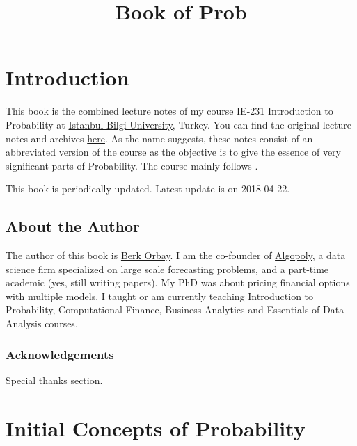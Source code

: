 \documentclass[]{book}
\title{Book of Prob}
\author{}
\date{}
\theoremstyle{definition}
\theoremstyle{definition}
\theoremstyle{definition}
\theoremstyle{remark}
\begin{document}
\maketitle

{
\setcounter{tocdepth}{1}
\tableofcontents
}
\hypertarget{introduction}{%
\chapter*{Introduction}\label{introduction}}

This book is the combined lecture notes of my course IE-231 Introduction
to Probability at \href{https://www.bilgi.edu.tr}{Istanbul Bilgi
University}, Turkey. You can find the original lecture notes and
archives \href{https://berkorbay.github.io/bilgi-ie231/}{here}. As the
name suggests, these notes consist of an abbreviated version of the
course as the objective is to give the essence of very significant parts
of Probability. The course mainly follows \citep{myers2012}.

This book is periodically updated. Latest update is on 2018-04-22.

\hypertarget{about-the-author}{%
\section*{About the Author}\label{about-the-author}}

The author of this book is \href{http://berkorbay.me}{Berk Orbay}. I am
the co-founder of \href{http://algopoly.com}{Algopoly}, a data science
firm specialized on large scale forecasting problems, and a part-time
academic (yes, still writing papers). My PhD was about pricing financial
options with multiple models. I taught or am currently teaching
Introduction to Probability, Computational Finance, Business Analytics
and Essentials of Data Analysis courses.

\hypertarget{acknowledgements}{%
\subsection*{Acknowledgements}\label{acknowledgements}}

Special thanks section.

\hypertarget{intro}{%
\chapter{Initial Concepts of Probability}\label{intro}}
\end{document}
